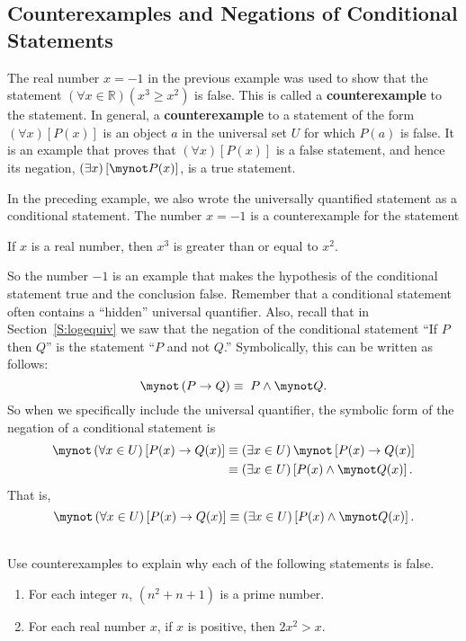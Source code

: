 \subsection*{Counterexamples and Negations of Conditional Statements}
%
The real number  $x =  - 1$ in the previous example was used to show that the statement  
$\left( {\forall x \in \mathbb{R}} \right)\left( {x^3  \geq x^2 } \right)$ is false.  This is called a \textbf{counterexample} to the statement.  In general, a \textbf{counterexample} 
\label{D:counterexample2}%
to a statement of the form  $\left( {\forall x} \right)\left[ {P( x )} \right]$ is an object  $a$  in the universal set  $U$  for which  $P( a )$ is false.  It is an example that proves that  $\left( {\forall x} \right)\left[ {P( x )} \right]$ is a false statement, and hence its negation, 
$\left( {\exists x} \right)\left[ {\mynot  P( x )} \right]$,  is a  true statement.

In the preceding example, we also wrote the universally quantified statement as a conditional statement.  The number  $x =  - 1$ is a counterexample for the statement 
%
\begin{center}
If  $x$  is a real number, then  $x^3 $ is greater than or equal to  $x^2 $.
\end{center}
%
So the number $-1$  is an example that makes the hypothesis of the conditional statement true and the conclusion false.  Remember that a conditional statement often contains a ``hidden'' universal quantifier.  Also, recall that in Section~\ref{S:logequiv} we saw that the negation of the conditional statement ``If $P$ then $Q$'' is the statement ``$P$ and not $Q$.''  Symbolically, this can be written as follows:
\[
\mynot  \left( {P \to Q} \right) \equiv \;P \wedge \mynot  Q.
\]
So when we specifically include the universal quantifier, the symbolic form of the negation of a conditional statement is
%
\[
\begin{aligned}
  \mynot  \left( {\forall x} \in U \right)\left[ {P( x ) \to Q( x )} \right] &\equiv \left( {\exists x} \in U \right)\mynot  \left[ {P( x ) \to Q( x )} \right] \\ 
&\equiv \left( {\exists x} \in U \right)\left[ {P( x ) \wedge \mynot  Q( x )} \right]. \\ 
\end{aligned} 
\]
%
That is,
%
\[
\mynot  \left( {\forall x} \in U \right)\left[ {P( x ) \to Q( x )} \right] \equiv \left( {\exists x} \in U \right)\left[ {P( x ) \wedge \mynot  Q( x )} \right].
\]
%
\hbreak
\begin{prog}\label{pr:counterexamples} \hfill \\
Use counterexamples to explain why each of the following statements is false.
\begin{enumerate}
\item For each integer $n$, $\left( n^2 + n + 1 \right)$ is a prime number.

\item For each real number $x$, if $x$ is positive, then $2x^2 > x$.
\end{enumerate}
\end{prog}
\hbreak

